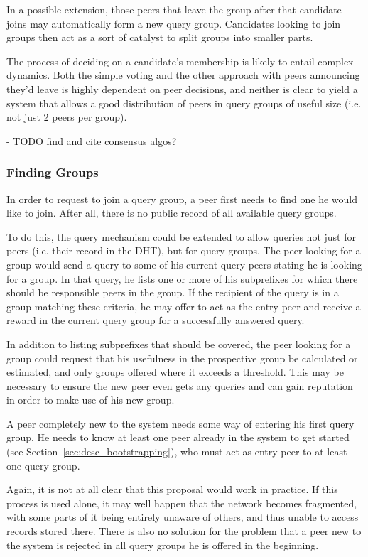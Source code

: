 In a possible extension, those peers that leave the group after that candidate
joins may automatically form a new query group. Candidates looking to join
groups then act as a sort of catalyst to split groups into smaller parts.

The process of deciding on a candidate's membership is likely to entail complex
dynamics. Both the simple voting and the other approach with peers announcing
they'd leave is highly dependent on peer decisions, and neither is clear to
yield a system that allows a good distribution of peers in query groups of
useful size (i.e. not just 2 peers per group).

- TODO find and cite consensus algos?

\subsubsection{Finding Groups}
In order to request to join a query group, a peer first needs to find one he
would like to join. After all, there is no public record of all available query
groups.

To do this, the query mechanism could be extended to allow queries not just for
peers (i.e. their record in the \ac{DHT}), but for query groups. The peer
looking for a group would send a query to some of his current query peers
stating he is looking for a group. In that query, he lists one or more of his
subprefixes for which there should be responsible peers in the group. If the
recipient of the query is in a group matching these criteria, he may offer to
act as the entry peer and receive a reward in the current query group for a
successfully answered query.

In addition to listing subprefixes that should be covered, the peer looking for
a group could request that his usefulness in the prospective group be calculated
or estimated, and only groups offered where it exceeds a threshold. This may be
necessary to ensure the new peer even gets any queries and can gain reputation
in order to make use of his new group.

A peer completely new to the system needs some way of entering his first query
group. He needs to know at least one peer already in the system to get started
(see Section~\ref{sec:desc_bootstrapping}), who must act as entry peer to at
least one query group.

Again, it is not at all clear that this proposal would work in practice. If this
process is used alone, it may well happen that the network becomes fragmented,
with some parts of it being entirely unaware of others, and thus unable to
access records stored there. There is also no solution for the problem that a
peer new to the system is rejected in all query groups he is offered in the
beginning.

